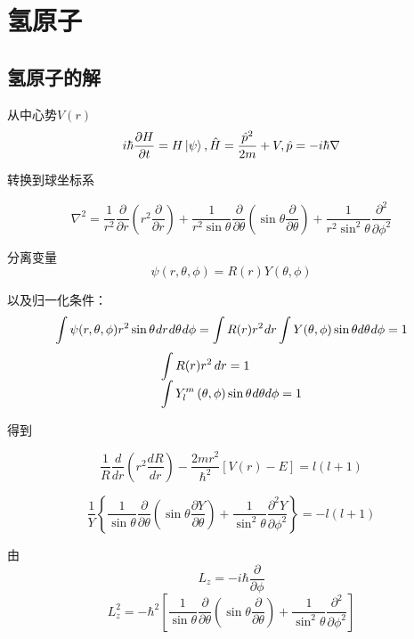 \section{氢原子}
\subsection{氢原子的解}
从中心势\(V(r)\)
\[i\hbar\frac{\partial H}{\partial t}=H\ket{\psi } ,\hat{H}=\frac{\hat{p}^{2}}{2m}+V, \hat{p}=-i\hbar\nabla\]

转换到球坐标系

\[
\nabla^{2}=\frac{1}{r^{2}}\frac{\partial}{\partial r}\left(r^{2}\frac{\partial}{\partial r}\right)+\frac{1}{r^{2}\sin\theta}\frac{\partial}{\partial\theta}\left(\sin\theta\frac{\partial}{\partial\theta}\right)+\frac{1}{r^{2}\sin^{2}\theta}\frac{\partial^{2}}{\partial\phi^{2}}
\]

分离变量\[\psi(r,\theta,\phi)=R(r)Y(\theta,\phi)\]

以及归一化条件：
\[\int \psi  (r,\theta ,\phi ){r^2}\sin \theta {\mkern 1mu} dr{\mkern 1mu} d\theta {\mkern 1mu} d\phi  = \int R (r){r^2}{\mkern 1mu} dr\int Y (\theta ,\phi )\sin \theta d\theta {\mkern 1mu} d\phi =1\]
\[
\begin{array}{l}
	\displaystyle \int R(r) r^{2} \, dr = 1 \\
	\displaystyle \int {Y_l^m\left( {\theta ,\phi } \right)} \sin \theta {\mkern 1mu} d\theta d\phi  = 1
\end{array}
\]

得到

\begin{equation}\label{central_equation}
	\frac{1}{R}\frac{d}{{dr}}\left( {{r^2}\frac{{dR}}{{dr}}} \right) - \frac{{2m{r^2}}}{{{\hbar ^2}}}[V(r) - E] = l( l + 1)
\end{equation}

\begin{equation}\label{H_V}
	\frac{1}{Y}\left\{ {\frac{1}{{\sin \theta }}\frac{\partial }{{\partial \theta }}\left( {\sin \theta \frac{{\partial Y}}{{\partial \theta }}} \right) + \frac{1}{{{{\sin }^2}\theta }}\frac{{{\partial ^2}Y}}{{\partial {\phi ^2}}}} \right\} =  - l(l + 1)		
\end{equation}

由
\[ L_z = - i\hbar \frac{\partial }{{\partial \phi }}\]
\[L_z^2 =  - {\hbar ^2}\left[ {\frac{1}{{\sin \theta }}\frac{\partial }{{\partial \theta }}\left( {\sin \theta \frac{\partial }{{\partial \theta }}} \right) + \frac{1}{{{{\sin }^2}\theta }}\frac{{{\partial ^2}}}{{\partial {\phi ^2}}}} \right]\]

